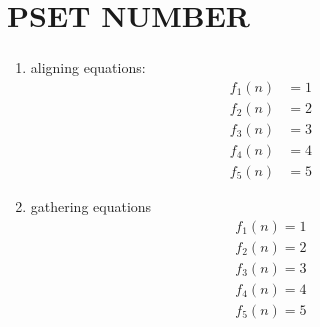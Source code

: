 \documentclass[12pt]{article}
\renewcommand{\psetnum}{NUMBER}
\begin{document}
\setlength{\abovedisplayskip}{6pt}
\setlength{\belowdisplayskip}{6pt}
\setcounter{page}{1}
\thispagestyle{firstpage}
\vspace*{-30pt}

\part*{PSET \psetnum}

\section{}
    \begin{enumerate}
        \item
            aligning equations:
            \begin{align*}
                f_1(n) &= 1 \\
                f_2(n) &= 2 \\
                f_3(n) &= 3 \\
                f_4(n) &= 4 \\
                f_5(n) &= 5
            \end{align*}

        \item
            gathering equations
            \begin{gather*}
                f_1(n) = 1 \\
                f_2(n) = 2 \\
                f_3(n) = 3 \\
                f_4(n) = 4 \\
                f_5(n) = 5
            \end{gather*}

    \end{enumerate}
\end{document}
